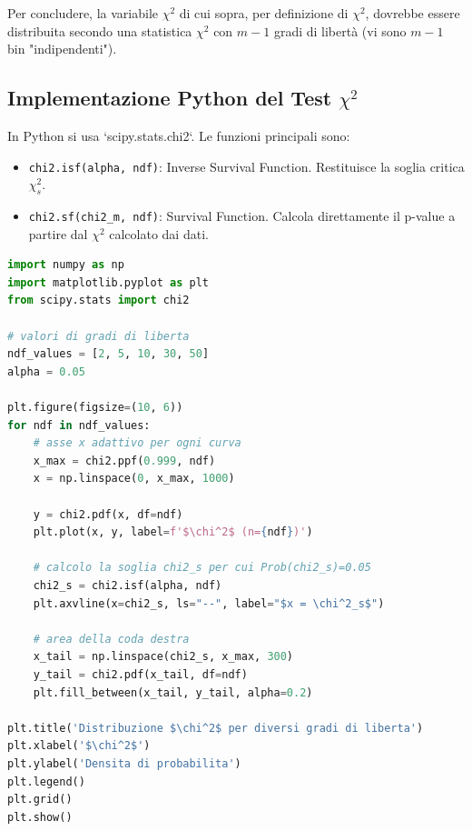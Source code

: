 \documentclass[openany,a4paper,12pt]{book}
\theoremstyle{remark}
\begin{document}
Per concludere, la variabile $\chi^2$ di cui sopra, per definizione di $\chi^2$, dovrebbe essere distribuita secondo una statistica $\chi^2$ con $m-1$ gradi di libertà (vi sono $m-1$ bin "indipendenti").

\subsection*{Implementazione Python del Test $\chi^2$}
In Python si usa `scipy.stats.chi2`. Le funzioni principali sono:
\begin{itemize}
    \item \texttt{chi2.isf(alpha, ndf)}: Inverse Survival Function. Restituisce la soglia critica $\chi^2_s$.
    \item \texttt{chi2.sf(chi2\_m, ndf)}: Survival Function. Calcola direttamente il p-value a partire dal $\chi^2$ calcolato dai dati.
\end{itemize}

\begin{lstlisting}[language=Python, caption=Script Python: Test del Chi-Quadro - Parte 1]
import numpy as np
import matplotlib.pyplot as plt
from scipy.stats import chi2

# valori di gradi di liberta
ndf_values = [2, 5, 10, 30, 50]
alpha = 0.05

plt.figure(figsize=(10, 6))
for ndf in ndf_values:
    # asse x adattivo per ogni curva
    x_max = chi2.ppf(0.999, ndf)
    x = np.linspace(0, x_max, 1000)

    y = chi2.pdf(x, df=ndf)
    plt.plot(x, y, label=f'$\chi^2$ (n={ndf})')
    
    # calcolo la soglia chi2_s per cui Prob(chi2_s)=0.05
    chi2_s = chi2.isf(alpha, ndf)
    plt.axvline(x=chi2_s, ls="--", label="$x = \chi^2_s$")

    # area della coda destra
    x_tail = np.linspace(chi2_s, x_max, 300)
    y_tail = chi2.pdf(x_tail, df=ndf)
    plt.fill_between(x_tail, y_tail, alpha=0.2)

plt.title('Distribuzione $\chi^2$ per diversi gradi di liberta')
plt.xlabel('$\chi^2$')
plt.ylabel('Densita di probabilita')
plt.legend()
plt.grid()
plt.show()
\end{lstlisting}
\end{document}
